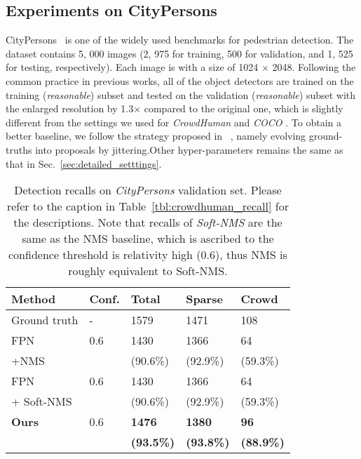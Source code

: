 \documentclass[10pt,twocolumn,letterpaper]{article}
\begin{document}
\subsection{Experiments on CityPersons}

CityPersons~\cite{zhang2017citypersons} is one of the widely used benchmarks for pedestrian detection. The dataset contains 5, 000 images (2, 975 for training, 500 for validation, and 1, 525 for testing, respectively). Each image is with a size of 1024 $\times$ 2048. Following the common practice in previous works, all of the object detectors are trained on the training (\emph{reasonable}) subset and tested on the validation (\emph{reasonable}) subset with the enlarged resolution by 1.3$\times$ compared to the original one, which is slightly different from the settings we used for \emph{CrowdHuman} \cite{shao2018crowdhuman} and \emph{COCO} \cite{lin2014microsoft}. To obtain a better baseline, we follow the strategy proposed in ~\cite{chi2019pedhunter}, namely evolving ground-truths into proposals by jittering.Other hyper-parameters remains the same as that in Sec.~\ref{sec:detailed_setttings}.  

\begin{table}[ht]
\centering
\begin{tabular}{p{23mm}|p{9mm}<{\centering}|p{10mm}<{\centering}p{10mm}<{\centering}p{10mm}<{\centering}}
\toprule
 Method & Conf. & Total & Sparse  & Crowd \\
\hline
Ground truth & - & 1579 & 1471 & 108 \\
\hline
FPN & 0.6 & 1430   & 1366 & 64 \\
+NMS & & (90.6\%) & (92.9\%) & (59.3\%) \\
\hline
FPN  & 0.6 & 1430   & 1366 & 64 \\
 + Soft-NMS \cite{softnms} & & (90.6\%) & (92.9\%) & (59.3\%) \\
\hline

\textbf{Ours}  & 0.6 &  \textbf{1476} & \textbf{1380} & \textbf{96} \\
       	& & \textbf{(93.5\%)} & \textbf{(93.8\%)} & \textbf{(88.9\%)} \\
\bottomrule
\end{tabular}
\caption{Detection recalls on \emph{CityPersons} validation set. Please refer to the caption in Table~\ref{tbl:crowdhuman_recall} for the descriptions. Note that recalls of \emph{Soft-NMS} \cite{softnms} are the same as the NMS baseline, which is ascribed to the confidence threshold is relativity high (0.6), thus NMS is roughly equivalent to Soft-NMS. }

\label{tbl:citypersons_recall}
\end{table}
\end{document}
